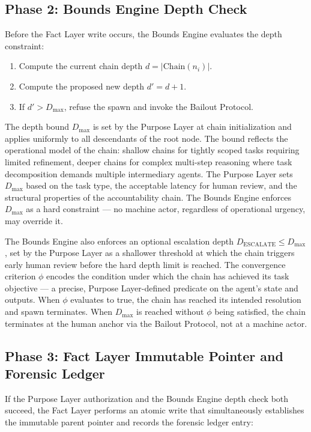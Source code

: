 \subsection{Phase 2: Bounds Engine Depth Check}

Before the Fact Layer write occurs, the Bounds Engine evaluates the depth constraint:

\begin{enumerate}
  \item Compute the current chain depth $d = |\mathrm{Chain}(n_i)|$.
  \item Compute the proposed new depth $d' = d + 1$.
  \item If $d' > D_{\max}$, refuse the spawn and invoke the Bailout Protocol.
\end{enumerate}

The depth bound $D_{\max}$ is set by the Purpose Layer at chain initialization and applies uniformly to all descendants of the root node. The bound reflects the operational model of the chain: shallow chains for tightly scoped tasks requiring limited refinement, deeper chains for complex multi-step reasoning where task decomposition demands multiple intermediary agents. The Purpose Layer sets $D_{\max}$ based on the task type, the acceptable latency for human review, and the structural properties of the accountability chain. The Bounds Engine enforces $D_{\max}$ as a hard constraint — no machine actor, regardless of operational urgency, may override it.

The Bounds Engine also enforces an optional escalation depth $D_{\mathrm{ESCALATE}} \leq D_{\max}$, set by the Purpose Layer as a shallower threshold at which the chain triggers early human review before the hard depth limit is reached. The convergence criterion $\phi$ encodes the condition under which the chain has achieved its task objective — a precise, Purpose Layer-defined predicate on the agent's state and outputs. When $\phi$ evaluates to true, the chain has reached its intended resolution and spawn terminates. When $D_{\max}$ is reached without $\phi$ being satisfied, the chain terminates at the human anchor via the Bailout Protocol, not at a machine actor.

\subsection{Phase 3: Fact Layer Immutable Pointer and Forensic Ledger}

If the Purpose Layer authorization and the Bounds Engine depth check both succeed, the Fact Layer performs an atomic write that simultaneously establishes the immutable parent pointer and records the forensic ledger entry:

